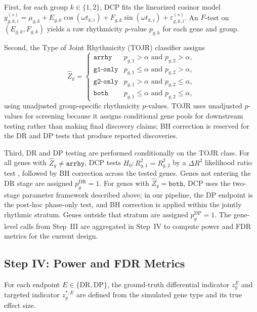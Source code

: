 \documentclass{article}
\begin{document}
First, for each group $k\in\{1,2\}$, DCP fits the linearized cosinor model
\(y_{g,k,i}^{(s)}=\mu_{g,k}+E_{g,k}\cos(\omega t_{k,i})+F_{g,k}\sin(\omega t_{k,i})
+\varepsilon_{g,k,i}^{(s)}\).
An $F$-test on $(E_{g,k},F_{g,k})$ yields a raw rhythmicity $p$-value $p_{g,k}$
for each gene and group.

Second, the Type of Joint Rhythmicity (TOJR) classifier assigns
\begin{equation}
\hat{Z}_g =
\begin{cases}
\texttt{arrhy} & p_{g,1}>\alpha \text{ and } p_{g,2}>\alpha,\\
\texttt{g1-only} & p_{g,1}\leq\alpha \text{ and } p_{g,2}>\alpha,\\
\texttt{g2-only} & p_{g,1}>\alpha \text{ and } p_{g,2}\leq\alpha,\\
\texttt{both} & p_{g,1}\leq\alpha \text{ and } p_{g,2}\leq\alpha,
\end{cases}
\label{eq:tojr}
\end{equation}
using unadjusted group-specific rhythmicity $p$-values. TOJR uses unadjusted
$p$-values for screening because it assigns conditional gene pools for
downstream testing rather than making final discovery claims; BH correction
is reserved for the DR and DP tests that produce reported discoveries.

Third, DR and DP testing are performed conditionally on the TOJR class. For
all genes with $\hat{Z}_g\neq\texttt{arrhy}$, DCP tests
$H_0:R^2_{g,1}=R^2_{g,2}$ by a $\Delta R^2$ likelihood ratio test
\cite{ding2021likelihood}, followed by BH correction across the tested genes.
Genes not entering the DR stage are assigned $p_g^{\mathrm{DR}}=1$.
For genes with $\hat{Z}_g=\texttt{both}$, DCP uses the two-stage parameter
framework described above; in our pipeline, the DP endpoint is the post-hoc
phase-only test, and BH correction is applied within the jointly rhythmic
stratum. Genes outside that stratum are assigned $p_g^{\mathrm{DP}}=1$.
The gene-level calls from Step~III are aggregated in Step~IV to compute
power and FDR metrics for the current design.

\subsection{Step IV: Power and FDR Metrics}
\label{sec:metrics}

For each endpoint $E\in\{\mathrm{DR},\mathrm{DP}\}$, the ground-truth
differential indicator $z_g^E$ and targeted indicator $z_g^{*,E}$ are defined
from the simulated gene type and its true effect size.
\end{document}
